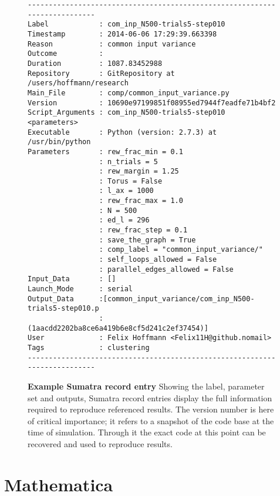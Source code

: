 \begin{figure}[H]
  \vspace{2cm}
  \scriptsize
\hspace{0.4cm}
\begin{minipage}{0.7\linewidth}
\begin{verbatim}
---------------------------------------------------------------------------
Label            : com_inp_N500-trials5-step010
Timestamp        : 2014-06-06 17:29:39.663398
Reason           : common input variance
Outcome          : 
Duration         : 1087.83452988
Repository       : GitRepository at /users/hoffmann/research
Main_File        : comp/common_input_variance.py
Version          : 10690e97199851f08955ed7944f7eadfe71b4bf2
Script_Arguments : com_inp_N500-trials5-step010 <parameters>
Executable       : Python (version: 2.7.3) at /usr/bin/python
Parameters       : rew_frac_min = 0.1
                 : n_trials = 5
                 : rew_margin = 1.25
                 : Torus = False
                 : l_ax = 1000
                 : rew_frac_max = 1.0
                 : N = 500
                 : ed_l = 296
                 : rew_frac_step = 0.1
                 : save_the_graph = True
                 : comp_label = "common_input_variance/"
                 : self_loops_allowed = False
                 : parallel_edges_allowed = False
Input_Data       : []
Launch_Mode      : serial
Output_Data      :[common_input_variance/com_inp_N500-trials5-step010.p
                 : (1aacdd2202ba8ce6a419b6e8cf5d241c2ef37454)]
User             : Felix Hoffmann <Felix11H@github.nomail>
Tags             : clustering
---------------------------------------------------------------------------
\end{verbatim}
\end{minipage}
\normalsize
\captionsetup{skip=18pt}
\caption{\label{fig:sumatra}%
  \textbf{Example Sumatra record entry} Showing the label, parameter
  set and outputs, Sumatra record entries display the full information
  required to reproduce referenced results. The version number is here
  of critical importance; it refers to a snapshot of the code base at
  the time of simulation. Through it the exact code at this point can
  be recovered and used to reproduce results.}
\end{figure}






\section{Mathematica}


